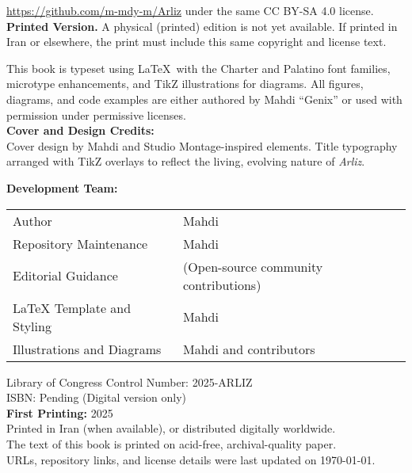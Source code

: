 \begin{center}
{		\url{https://github.com/m-mdy-m/Arliz}\newline
		under the same CC BY-SA 4.0 license.\newline
		\vspace{1.5em}
		\textbf{Printed Version.} A physical (printed) edition is not yet available. If printed in Iran or elsewhere, the print must include this same copyright and license text.\\
		\vspace{1.5em}
		{\small
			This book is typeset using \LaTeX\ with the Charter and Palatino font families, microtype enhancements, and TikZ illustrations for diagrams. All figures, diagrams, and code examples are either authored by Mahdi “Genix” or used with permission under permissive licenses.\\
			\vspace{0.5em}
			\textbf{Cover and Design Credits:}\\
			Cover design by Mahdi and Studio Montage-inspired elements. Title typography arranged with TikZ overlays to reflect the living, evolving nature of \emph{Arliz}.\\
			\newpage
			
			\textbf{Development Team:}\\
			\vspace{1.5em}
			\begin{tabular}{@{}l l@{}}
				Author                             & Mahdi\\
				Repository Maintenance             & Mahdi\\
				Editorial Guidance                 & (Open-source community contributions) \\
				LaTeX Template and Styling         & Mahdi\\
				Illustrations and Diagrams         & Mahdi and contributors \\
			\end{tabular}
		}
	}
\end{center}

\vfill

\begin{flushleft}
	{\small
		Library of Congress Control Number: 2025-ARLIZ\\
		ISBN: Pending (Digital version only)\\
		\textbf{First Printing:} 2025\\
		Printed in Iran (when available), or distributed digitally worldwide.\\
		The text of this book is printed on acid-free, archival-quality paper.\\
		URLs, repository links, and license details were last updated on \today.
	}
\end{flushleft}
\clearpage